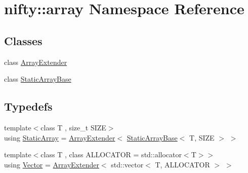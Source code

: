 \hypertarget{namespacenifty_1_1array}{}\section{nifty\+:\+:array Namespace Reference}
\label{namespacenifty_1_1array}
\subsection*{Classes}
\begin{DoxyCompactItemize}
\item 
class \hyperlink{classnifty_1_1array_1_1ArrayExtender}{Array\+Extender}
\item 
class \hyperlink{classnifty_1_1array_1_1StaticArrayBase}{Static\+Array\+Base}
\end{DoxyCompactItemize}
\subsection*{Typedefs}
\begin{DoxyCompactItemize}
\item 
{\footnotesize template$<$class T , size\+\_\+t S\+I\+Z\+E$>$ }\\using \hyperlink{namespacenifty_1_1array_a683f151f19c851754e0c6d55ed16a0c2}{Static\+Array} = \hyperlink{classnifty_1_1array_1_1ArrayExtender}{Array\+Extender}$<$ \hyperlink{classnifty_1_1array_1_1StaticArrayBase}{Static\+Array\+Base}$<$ T, S\+I\+Z\+E $>$ $>$
\item 
{\footnotesize template$<$class T , class A\+L\+L\+O\+C\+A\+T\+O\+R  = std\+::allocator$<$\+T$>$$>$ }\\using \hyperlink{namespacenifty_1_1array_aa0fe9e5e97322da484fa8ffd2fe44cd5}{Vector} = \hyperlink{classnifty_1_1array_1_1ArrayExtender}{Array\+Extender}$<$ std\+::vector$<$ T, A\+L\+L\+O\+C\+A\+T\+O\+R $>$ $>$
\end{DoxyCompactItemize}
